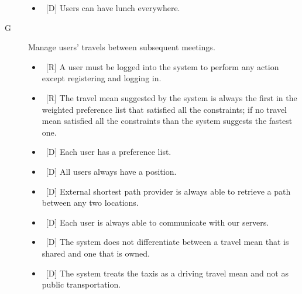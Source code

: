 \begin{description}
\begin{itemize}
\item~[D] Users can have lunch everywhere.
\end{itemize}

\item[G\thecountReq] Manage users’ travels between subsequent meetings.

\begin{itemize}
\item~[R] A user must be logged into the system to perform any action except registering and logging in.
\item~[R] The travel mean suggested by the system is always the first in the weighted preference list that satisfied all the constraints; if no travel mean satisfied all the constraints than the system suggests the fastest one.
\end{itemize}

\begin{itemize}
\item~[D] Each user has a preference list.
\item~[D] All users always have a position.
\item~[D] External shortest path provider is always able to retrieve a path between any two locations.
\item~[D] Each user is always able to communicate with our servers.
\item~[D] The system does not differentiate between a travel mean that is shared and one that is owned.
\item~[D] The system treats the taxis as a driving travel mean and not as public transportation.
\end{itemize}
\end{description}